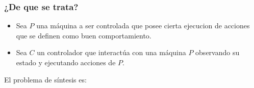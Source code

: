 \begin{frame}[plain]
\frametitle{¿De que se trata?}
\begin{itemize}
   \item Sea $P$ una máquina a ser controlada que posee cierta ejecucion de acciones que se definen como buen comportamiento.\\
\vspace{3 mm}
   \item Sea $C$ un controlador que interactúa con una máquina $P$ observando su estado y ejecutando acciones de $P$.\\
\end{itemize}
\vspace{10 mm}

   \centerline{El problema de síntesis es:}
\vspace{3 mm}

\color{red}{Dado una máquina $P$ ¿existe un controlador $C$ cuyas interacciones con P produce solo buenos resultados?}
\end{frame}


